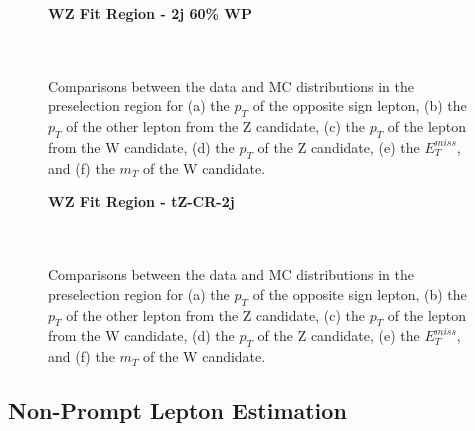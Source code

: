\begin{figure}[H]
    \centering
    \textbf{WZ Fit Region - 2j 60\% WP}\\
    \\
    \\
    \caption{Comparisons between the data and MC distributions in the preselection region for (a) the $p_T$ of the opposite sign lepton, (b) the $p_T$ of the other lepton from the Z candidate, (c) the $p_T$ of the lepton from the W candidate, (d) the $p_T$ of the Z candidate, (e) the $E_T^{miss}$, and (f) the $m_T$ of the W candidate.}
    \label{kin:WP_2j_60}
\end{figure}

\begin{figure}[H]
    \textbf{WZ Fit Region - tZ-CR-2j}\\
    \\
    \\
    \caption{Comparisons between the data and MC distributions in the preselection region for (a) the $p_T$ of the opposite sign lepton, (b) the $p_T$ of the other lepton from the Z candidate, (c) the $p_T$ of the lepton from the W candidate, (d) the $p_T$ of the Z candidate, (e) the $E_T^{miss}$, and (f) the $m_T$ of the W candidate.}
    \label{kin:tZ_CR_2j}
\end{figure}

\subsection{Non-Prompt Lepton Estimation}
\label{sec:fakes}

